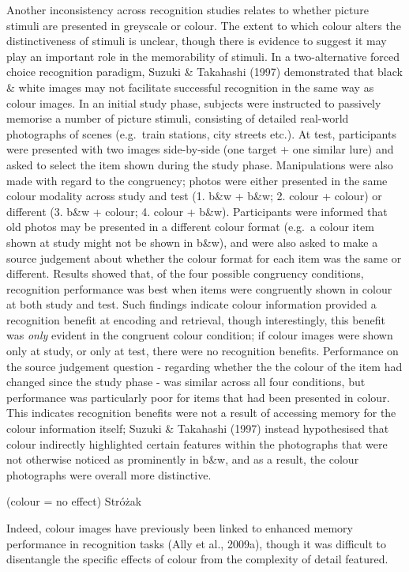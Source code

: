 \documentclass[
  11pt,
]{article}
\begin{document}
Another inconsistency across recognition studies relates to whether
picture stimuli are presented in greyscale or colour. The extent to
which colour alters the distinctiveness of stimuli is unclear, though
there is evidence to suggest it may play an important role in the
memorability of stimuli. In a two-alternative forced choice recognition
paradigm, Suzuki \& Takahashi (1997) demonstrated that black \& white
images may not facilitate successful recognition in the same way as
colour images. In an initial study phase, subjects were instructed to
passively memorise a number of picture stimuli, consisting of detailed
real-world photographs of scenes (e.g.~train stations, city streets
etc.). At test, participants were presented with two images side-by-side
(one target + one similar lure) and asked to select the item shown
during the study phase. Manipulations were also made with regard to the
congruency; photos were either presented in the same colour modality
across study and test (1. b\&w + b\&w; 2. colour + colour) or different
(3. b\&w + colour; 4. colour + b\&w). Participants were informed that
old photos may be presented in a different colour format (e.g.~a colour
item shown at study might not be shown in b\&w), and were also asked to
make a source judgement about whether the colour format for each item
was the same or different. Results showed that, of the four possible
congruency conditions, recognition performance was best when items were
congruently shown in colour at both study and test. Such findings
indicate colour information provided a recognition benefit at encoding
and retrieval, though interestingly, this benefit was \emph{only}
evident in the congruent colour condition; if colour images were shown
only at study, or only at test, there were no recognition benefits.
Performance on the source judgement question - regarding whether the the
colour of the item had changed since the study phase - was similar
across all four conditions, but performance was particularly poor for
items that had been presented in colour. This indicates recognition
benefits were not a result of accessing memory for the colour
information itself; Suzuki \& Takahashi (1997) instead hypothesised that
colour indirectly highlighted certain features within the photographs
that were not otherwise noticed as prominently in b\&w, and as a result,
the colour photographs were overall more distinctive.

(colour = no effect) Stróżak

Indeed, colour images have previously been linked to enhanced memory
performance in recognition tasks (Ally et al., 2009a), though it was
difficult to disentangle the specific effects of colour from the
complexity of detail featured.
\end{document}
